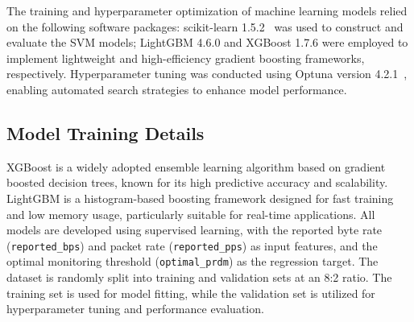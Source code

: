 The training and hyperparameter optimization of machine learning models relied on the following software packages: scikit-learn 1.5.2~\cite{Scikit-learn} was used to construct and evaluate the SVM models; LightGBM 4.6.0 and XGBoost 1.7.6 were employed to implement lightweight and high-efficiency gradient boosting frameworks, respectively. 
Hyperparameter tuning was conducted using Optuna version 4.2.1~\cite{Optuna}, enabling automated search strategies to enhance model performance.


\subsection{Model Training Details}
\label{subsection42}

\noindent
XGBoost is a widely adopted ensemble learning algorithm based on gradient boosted decision trees, known for its high predictive accuracy and scalability. 
LightGBM is a histogram-based boosting framework designed for fast training and low memory usage, particularly suitable for real-time applications. 
All models are developed using supervised learning, with the reported byte rate (\texttt{reported\_bps}) and packet rate (\texttt{reported\_pps}) as input features, and the optimal monitoring threshold (\texttt{optimal\_prdm}) as the regression target. 
The dataset is randomly split into training and validation sets at an 8:2 ratio. 
The training set is used for model fitting, while the validation set is utilized for hyperparameter tuning and performance evaluation.

